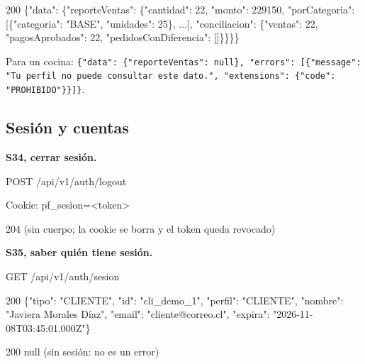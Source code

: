\begin{codigo}
200 \{"data":\allowbreak{} \{"reporteVentas":\allowbreak{} \{"cantidad":\allowbreak{} 22,\allowbreak{} "monto":\allowbreak{} 229150,\allowbreak{} "porCategoria":\allowbreak{} [\allowbreak{}\{"categoria":\allowbreak{} "BASE",\allowbreak{} "unidades":\allowbreak{} 25\},\allowbreak{} .\allowbreak{}.\allowbreak{}.\allowbreak{}],\allowbreak{} "conciliacion":\allowbreak{} \{"ventas":\allowbreak{} 22,\allowbreak{} "pagosAprobados":\allowbreak{} 22,\allowbreak{} "pedidosConDiferencia":\allowbreak{} [\allowbreak{}]\}\}\}\}\par
\end{codigo}

Para un cocina: \texttt{\{"data":\allowbreak{} \{"reporteVentas":\allowbreak{} null\},\allowbreak{} "errors":\allowbreak{} [\allowbreak{}\{"message":\allowbreak{} "Tu perfil no puede consultar este dato.\allowbreak{}",\allowbreak{} "extensions":\allowbreak{} \{"code":\allowbreak{} "PROHIBIDO"\}\}]\}}.


\subsection{Sesión y cuentas}

\textbf{S34, cerrar sesión.}


\begin{codigo}
POST /\allowbreak{}api/\allowbreak{}v1/\allowbreak{}auth/\allowbreak{}logout\par
Cookie:\allowbreak{} pf\_\allowbreak{}sesion=\allowbreak{}<token>\par
\end{codigo}

\begin{codigo}
204 (\allowbreak{}sin cuerpo; la cookie se borra y el token queda revocado)\par
\end{codigo}

\textbf{S35, saber quién tiene sesión.}


\begin{codigo}
GET /\allowbreak{}api/\allowbreak{}v1/\allowbreak{}auth/\allowbreak{}sesion\par
\end{codigo}

\begin{codigo}
200 \{"tipo":\allowbreak{} "CLIENTE",\allowbreak{} "id":\allowbreak{} "cli\_\allowbreak{}demo\_\allowbreak{}1",\allowbreak{} "perfil":\allowbreak{} "CLIENTE",\allowbreak{} "nombre":\allowbreak{} "Javiera Morales Díaz",\allowbreak{} "email":\allowbreak{} "cliente@correo.\allowbreak{}cl",\allowbreak{} "expira":\allowbreak{} "2026-\allowbreak{}11-\allowbreak{}08T03:\allowbreak{}45:\allowbreak{}01.\allowbreak{}000Z"\}\par
200 null   (\allowbreak{}sin sesión:\allowbreak{} no es un error)\par
\end{codigo}

